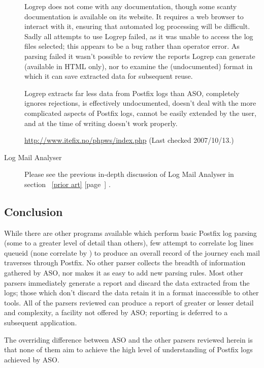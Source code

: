 \documentclass[a4paper,12pt,draft]{article}
\newcommand{\parsername}{ASO}
\newcommand{\refwithpage}[1]{%
    \empty{}\ref{#1} [page~\pageref{#1}]%
}
\begin{document}
\begin{description}
        Logrep does not come with any documentation, though some scanty
        documentation is available on its website.  It requires a web
        browser to interact with it, ensuring that automated log processing
        will be difficult.  Sadly all attempts to use Logrep failed, as it
        was unable to access the log files selected; this appears to be a
        bug rather than operator error.  As parsing failed it wasn't
        possible to review the reports Logrep can generate (available in
        HTML only), nor to examine the (undocumented) format in which it
        can save extracted data for subsequent reuse.

        Logrep extracts far less data from Postfix logs than \parsername{},
        completely ignores rejections, is effectively undocumented, doesn't
        deal with the more complicated aspects of Postfix logs, cannot be
        easily extended by the user, and at the time of writing doesn't
        work properly.

        \url{http://www.itefix.no/phpws/index.php} \newline (Last checked
        2007/10/13.)

    \item [Log Mail Analyser] Please see the previous in-depth discussion
        of Log Mail Analyser in section~\refwithpage{prior art}.

\end{description}

\subsection{Conclusion}

While there are other programs available which perform basic Postfix log
parsing (some to a greater level of detail than others), few attempt to
correlate log lines queueid (none correlate by \pid{}) to produce an
overall record of the journey each mail traverses through Postfix.  No
other parser collects the breadth of information gathered by \parsername{},
nor makes it as easy to add new parsing rules.  Most other parsers
immediately generate a report and discard the data extracted from the logs;
those which don't discard the data retain it in a format inaccessible to
other tools.  All of the parsers reviewed can produce a report of greater
or lesser detail and complexity, a facility not offered by \parsername{};
reporting is deferred to a subsequent application.

The overriding difference between \parsername{} and the other parsers
reviewed herein is that none of them aim to achieve the high level of
understanding of Postfix logs achieved by \parsername{}.
\end{document}
